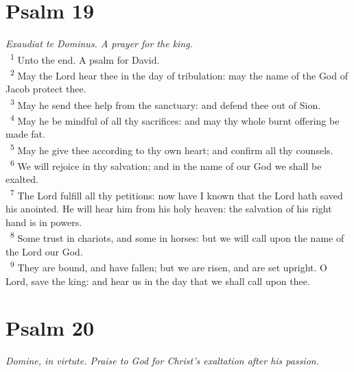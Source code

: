 \documentclass[a5paper,12pt]{article}
\begin{document}
\begin{multicols*}{2}
\section{Psalm 19}
\label{sec:orga80b727}
\emph{Exaudiat te Dominus. A prayer for the king.}\\

~\textsuperscript{1} Unto the end. A psalm for David.\\
~\textsuperscript{2} May the Lord hear thee in the day of tribulation: may the name of the God of Jacob protect thee.\\
~\textsuperscript{3} May he send thee help from the sanctuary: and defend thee out of Sion.\\
~\textsuperscript{4} May he be mindful of all thy sacrifices: and may thy whole burnt offering be made fat.\\
~\textsuperscript{5} May he give thee according to thy own heart; and confirm all thy counsels.\\
~\textsuperscript{6} We will rejoice in thy salvation; and in the name of our God we shall be exalted.\\
~\textsuperscript{7} The Lord fulfill all thy petitions: now have I known that the Lord hath saved his anointed. He will hear him from his holy heaven: the salvation of his right hand is in powers.\\
~\textsuperscript{8} Some trust in chariots, and some in horses: but we will call upon the name of the Lord our God.\\
~\textsuperscript{9} They are bound, and have fallen; but we are risen, and are set upright. O Lord, save the king: and hear us in the day that we shall call upon thee.\\

\section{Psalm 20}
\label{sec:orgfa76613}
\emph{Domine, in virtute. Praise to God for Christ's exaltation after his passion.}\\


\end{multicols*}
\end{document}
